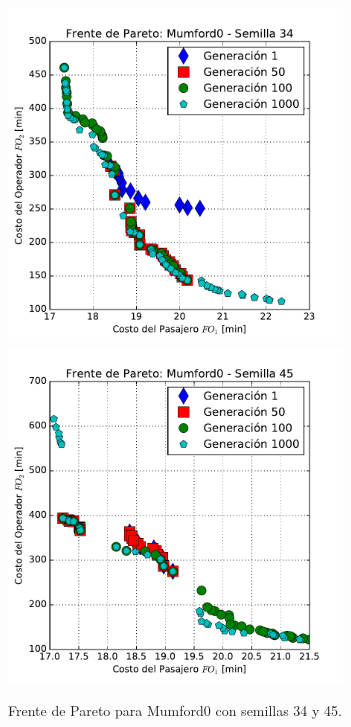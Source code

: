 \begin{figure}[p]
\centering
\includegraphics[width=0.79\textwidth]{img/frente_Mumford0_s34}
\includegraphics[width=0.79\textwidth]{img/frente_Mumford0_s45}
\caption{Frente de Pareto para Mumford0 con semillas 34 y 45.}
\label{fig:paretoMumford2}
\end{figure}

